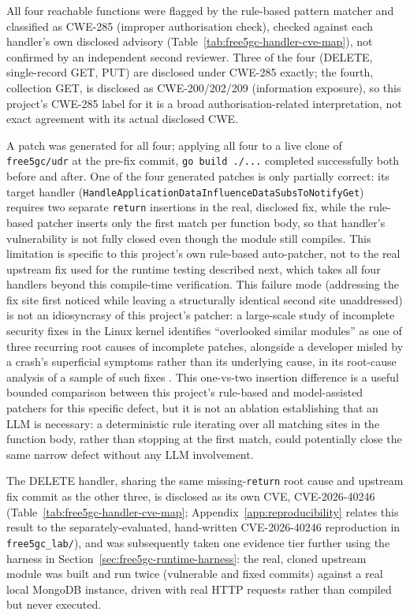 \documentclass[12pt,a4paper]{report}
\begin{document}
All four reachable functions were flagged by the rule-based pattern matcher and classified as CWE-285 (improper authorisation check), checked against each handler's own disclosed advisory (Table~\ref{tab:free5gc-handler-cve-map}), not confirmed by an independent second reviewer. Three of the four (DELETE, single-record GET, PUT) are disclosed under CWE-285 exactly; the fourth, collection GET, is disclosed as CWE-200/202/209 (information exposure), so this project's CWE-285 label for it is a broad authorisation-related interpretation, not exact agreement with its actual disclosed CWE.

A patch was generated for all four; applying all four to a live clone of \texttt{free5gc/udr} at the pre-fix commit, \texttt{go build ./...} completed successfully both before and after. One of the four generated patches is only partially correct: its target handler (\texttt{HandleApplicationDataInfluenceDataSubsToNotifyGet}) requires two separate \texttt{return} insertions in the real, disclosed fix, while the rule-based patcher inserts only the first match per function body, so that handler's vulnerability is not fully closed even though the module still compiles. This limitation is specific to this project's own rule-based auto-patcher, not to the real upstream fix used for the runtime testing described next, which takes all four handlers beyond this compile-time verification. This failure mode (addressing the fix site first noticed while leaving a structurally identical second site unaddressed) is not an idiosyncrasy of this project's patcher: a large-scale study of incomplete security fixes in the Linux kernel identifies ``overlooked similar modules'' as one of three recurring root causes of incomplete patches, alongside a developer misled by a crash's superficial symptoms rather than its underlying cause, in its root-cause analysis of a sample of such fixes \cite{incompletefixeskernel}. This one-vs-two insertion difference is a useful bounded comparison between this project's rule-based and model-assisted patchers for this specific defect, but it is not an ablation establishing that an LLM is necessary: a deterministic rule iterating over all matching sites in the function body, rather than stopping at the first match, could potentially close the same narrow defect without any LLM involvement.

The DELETE handler, sharing the same missing-\texttt{return} root cause and upstream fix commit as the other three, is disclosed as its own CVE, CVE-2026-40246 (Table~\ref{tab:free5gc-handler-cve-map}; Appendix~\ref{app:reproducibility} relates this result to the separately-evaluated, hand-written CVE-2026-40246 reproduction in \texttt{free5gc\_lab/}), and was subsequently taken one evidence tier further using the harness in Section~\ref{sec:free5gc-runtime-harness}: the real, cloned upstream module was built and run twice (vulnerable and fixed commits) against a real local MongoDB instance, driven with real HTTP requests rather than compiled but never executed.
\end{document}
